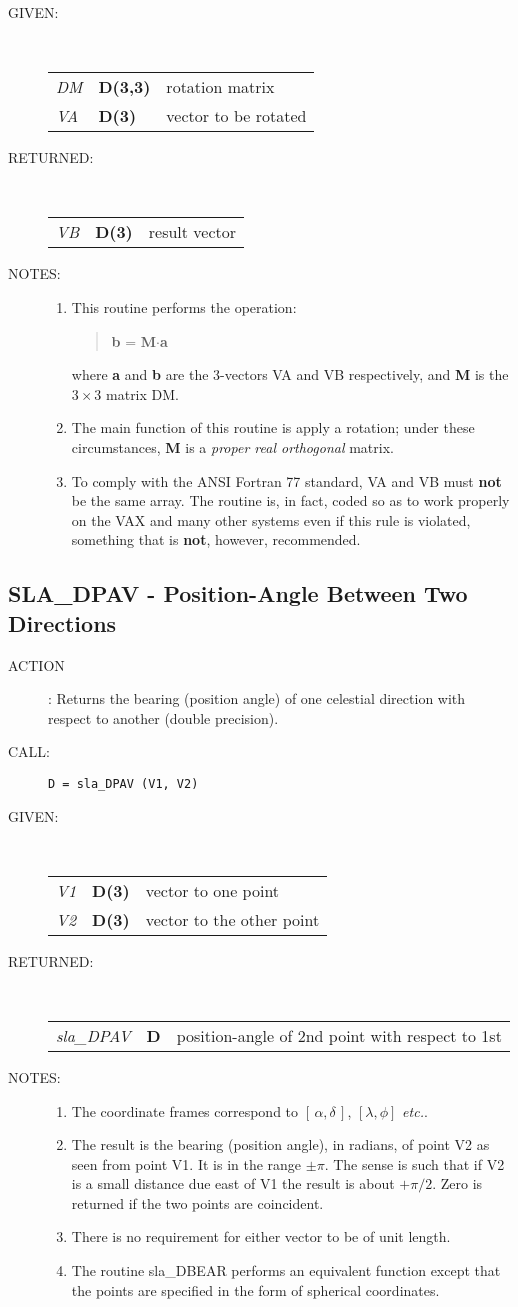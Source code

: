 \documentclass[11pt,twoside]{article}
\newcommand{\xlabel}[1]{}
\newcommand{\radec}     {$[\,\alpha,\delta\,]$}
\newcommand{\routine}[3]
{\hbadness=10000
  \vbox
  {
    \rule{\textwidth}{0.3mm}\\
    {\Large {\bf #1} \hfill #2 \hfill {\bf #1}}\\
    \setlength{\oldspacing}{\topsep}
    \setlength{\topsep}{0.3ex}
    \begin{description}
      #3
    \end{description}
    \setlength{\topsep}{\oldspacing}
  }
}
\renewcommand{\routine}[3]
   {
      \subsection{#1\xlabel{#1} - #2\label{#1}}
       \begin{description}
         #3
       \end{description}
   }
\newcommand{\action}[1]
{\item[ACTION]: #1}
\newcommand{\action}[1]
   {\item[ACTION:] #1}
\newcommand{\call}[1]
{\item[CALL]: \hspace{0.4em}{\tt #1}}
\newlength{\oldspacing}
\renewcommand{\call}[1]
   {
    \item[CALL:] {\tt #1}
   }
\newcommand{\args}[2]
{
  \goodbreak
  \setlength{\oldspacing}{\topsep}
  \setlength{\topsep}{0.3ex}
  \begin{description}
  \item[#1]:\\[1.5ex]
    \begin{tabular}{p{7em}p{6em}p{22em}}
      #2
    \end{tabular}
  \end{description}
  \setlength{\topsep}{\oldspacing}
}
\renewcommand{\args}[2]
   {
     \begin{description}
        \item[#1:]\\
        \begin{tabular}{p{7em}p{6em}l}
           #2
        \end{tabular}
     \end{description}
   }
\newcommand{\spec}[3]
{
  {\em {#1}} & {\bf \mbox{#2}} & {#3}
}
\newcommand{\notes}[1]
{
  \goodbreak
  \setlength{\oldspacing}{\topsep}
  \setlength{\topsep}{0.3ex}
  \begin{description}
    \item[NOTES]:
        #1
  \end{description}
  \setlength{\topsep}{\oldspacing}
}
\renewcommand{\notes}[1]
   {
      \begin{description}
         \item[NOTES:]
            #1
      \end{description}
   }
\begin{document}
\args{GIVEN}
{
 \spec{DM}{D(3,3)}{rotation matrix} \\
 \spec{VA}{D(3)}{vector to be rotated}
}
\args{RETURNED}
{
 \spec{VB}{D(3)}{result vector}
}
\notes
{
 \begin{enumerate}
  \item This routine performs the operation:
        \begin{verse}
           {\bf b} = {\bf M}$\cdot${\bf a}
        \end{verse}
        where {\bf a} and {\bf b} are the 3-vectors VA and VB
        respectively, and {\bf M} is the $3\times3$ matrix DM.
  \item The main function of this routine is apply a
        rotation;  under these circumstances, {\bf M} is a
        {\it proper real orthogonal}\/ matrix.
  \item To comply with the ANSI Fortran 77 standard, VA and VB must
        {\bf not} be the same array.  The routine is, in fact, coded
        so as to work properly on the VAX and many other systems even
        if this rule is violated, something that is {\bf not}, however,
        recommended.
 \end{enumerate}
}
\routine{SLA\_DPAV}{Position-Angle Between Two Directions}
{
 \action{Returns the bearing (position angle) of one celestial
         direction with respect to another (double precision).}
 \call{D~=~sla\_DPAV (V1, V2)}
}
\args{GIVEN}
{
 \spec{V1}{D(3)}{vector to one point} \\
 \spec{V2}{D(3)}{vector to the other point}
}
\args{RETURNED}
{
 \spec{sla\_DPAV}{D}{position-angle of 2nd point with respect to 1st}
}
\notes
{
 \begin{enumerate}
 \item The coordinate frames correspond to \radec,
       $[\lambda,\phi]$ {\it etc.}.
 \item The result is the bearing (position angle), in radians,
       of point V2 as seen
       from point V1.  It is in the range $\pm \pi$.  The sense
       is such that if V2
       is a small distance due east of V1 the result
       is about $+\pi/2$. Zero is returned
       if the two points are coincident.
 \item There is no requirement for either vector to be of unit length.
 \item The routine sla\_DBEAR performs an equivalent function except
       that the points are specified in the form of spherical coordinates.
 \end{enumerate}
}
\end{document}
